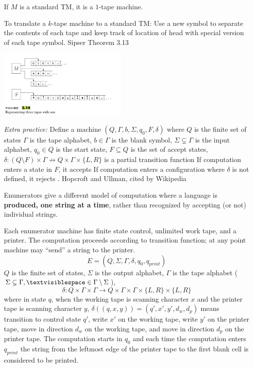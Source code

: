 \documentclass[12pt, oneside]{article}
\begin{document}
If $M$ is a standard  TM, it is a $1$-tape machine.


To translate a $k$-tape machine  to  a standard TM:
Use a  new symbol to separate the contents of each tape
and keep track of location of  head with  special version of each
tape symbol. {\tiny Sipser Theorem 3.13} 

\includegraphics[width=2.5in]{resources/images/Figure314.png}


{\it Extra practice:} 
Define a machine $(Q, \Gamma, b, \Sigma,  q_0, F, \delta)$
where $Q$ is the finite set  of  states
$\Gamma$  is the tape alphabet,
$b \in \Gamma$ is the blank symbol, 
$\Sigma \subsetneq \Gamma$ is the  input alphabet, 
$q_0 \in  Q$ is the start state, 
$F \subseteq Q$ is the set of accept states, 
$\delta: (Q \setminus F)  \times  \Gamma \not\to Q \times  \Gamma  \times \{L, R\}$
 is a partial transition function
If computation enters a state  in $F$, it  accepts 
If computation enters a configuration where
 $\delta$ is not defined, it  rejects . {\tiny Hopcroft and  Ullman, cited by  Wikipedia} 

\newpage
{} Enumerators give a different
model of computation where a language is {\bf produced, one string at a time},
rather than recognized by accepting (or not) individual strings.

Each enumerator machine has finite state control, unlimited work tape, and a printer. The computation proceeds
according to transition function; at any point machine may ``send'' a string to the printer.
\[
E  = (Q, \Sigma, \Gamma, \delta, q_0, q_{print})  
\]
$Q$ is the finite set of states, $\Sigma$ is  the output alphabet, $\Gamma$ is the 
tape alphabet ($\Sigma  \subsetneq\Gamma, 
\textvisiblespace \in \Gamma \setminus \Sigma$), 
\[
\delta:  Q  \times  \Gamma \times \Gamma \to  Q \times  \Gamma \times  \Gamma \times \{L, R\} \times  \{L, R\}
\]
where in state $q$, when the working tape is scanning character $x$ and the printer tape is scanning character $y$,
$\delta( (q,x,y) ) = (q', x', y', d_w, d_p)$ means transition to control state $q'$, write $x'$ on 
the working tape, write $y'$ on the printer tape, move in direction $d_w$ on the working tape, and move in direction 
$d_p$ on the printer tape. The computation starts in $q_0$ and each time the computation enters $q_{print}$
the string from the leftmost edge of the printer tape to the first blank cell is considered to be printed.
\end{document}

